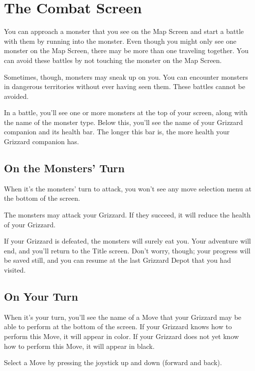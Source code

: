\documentclass[12pt,openright,book]{memoir}
\begin{document}
\section{The Combat Screen}

You can approach a monster that you see on the Map Screen and start a
battle with them by running into the monster. Even though you might
only see one monster on the Map Screen, there may be more than one
traveling together. You can avoid these battles by not touching the
monster on the Map Screen.

Sometimes,  though, monsters  may sneak  up  on you.  You can  encounter
monsters  in  dangerous  territories  without  ever  having  seen  them.
These battles cannot be avoided.

In a battle, you'll see one or  more monsters at the top of your screen,
along with the name of the monster type. Below this, you'll see the name
of your Grizzard  companion and its health bar. The  longer this bar is,
the more health your Grizzard companion has.

\subsection{On the Monsters' Turn}

When it's the monsters' turn to attack, you won't see any move selection
menu at the bottom of the screen.

The monsters may  attack your Grizzard. If they succeed,  it will reduce
the health of your Grizzard.

If  your  Grizzard  is  defeated,  the monsters  will  surely  eat  you.
Your  adventure  will  end,  and  you'll return  to  the  Title  screen.
Don't worry,  though; your  progress will  be saved  still, and  you can
resume at the last Grizzard Depot that you had visited.

\subsection{On Your Turn}

When it's your  turn, you'll see the  name of a Move  that your Grizzard
may be  able to perform  at the bottom of  the screen. If  your Grizzard
knows  how to  perform  this Move,  it  will appear  in  color. If  your
Grizzard does  not yet  know how  to perform this  Move, it  will appear
in black.

Select a Move by pressing the joystick up and down (forward and back).
\end{document}
